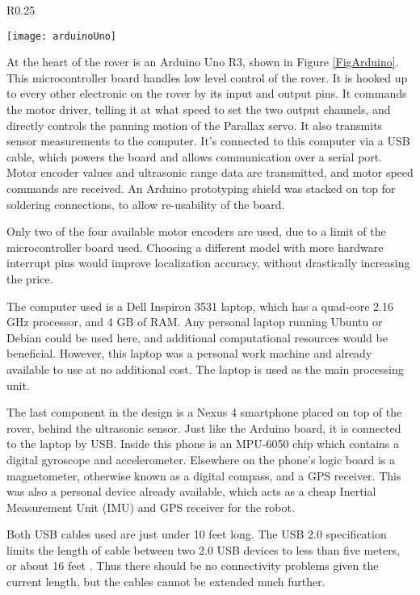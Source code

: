 \begin{wrapfigure}{R}{0.25\textwidth}
	\caption{\cite{fig_arduino_uno}}
	\centering
	\texttt{[image: arduinoUno]}
	\label{FigArduino}
\end{wrapfigure}

At the heart of the rover is an Arduino Uno R3, shown in Figure \ref{FigArduino}. This microcontroller board handles low level control of the rover. It is hooked up to every other electronic on the rover by its input and output pins. It commands the motor driver, telling it at what speed to set the two output channels, and directly controls the panning motion of the Parallax servo. It also transmits sensor measurements to the computer. It's connected to this computer via a USB cable, which powers the board and allows communication over a serial port. Motor encoder values and ultrasonic range data are transmitted, and motor speed commands are received. An Arduino prototyping shield was stacked on top for soldering connections, to allow re-usability of the board.

Only two of the four available motor encoders are used, due to a limit of the microcontroller board used. Choosing a different model with more hardware interrupt pins would improve localization accuracy, without drastically increasing the price.

The computer used is a Dell Inspiron 3531 laptop, which has a quad-core 2.16 GHz processor, and 4 GB of RAM. Any personal laptop running Ubuntu or Debian could be used here, and additional computational resources would be beneficial. However, this laptop was a personal work machine and already available to use at no additional cost. The laptop is used as the main processing unit.

The last component in the design is a Nexus 4 smartphone placed on top of the rover, behind the ultrasonic sensor. Just like the Arduino board, it is connected to the laptop by USB. Inside this phone is an MPU-6050 chip which contains a digital gyroscope and accelerometer. Elsewhere on the phone's logic board is a magnetometer, otherwise known as a digital compass, and a GPS receiver. This was also a personal device already available, which acts as a cheap Inertial Measurement Unit (IMU) and GPS receiver for the robot.

Both USB cables used are just under 10 feet long. The USB 2.0 specification limits the length of cable between two 2.0 USB devices to less than five meters, or about 16 feet \cite{usbForum}. Thus there should be no connectivity problems given the current length, but the cables cannot be extended much further. 

